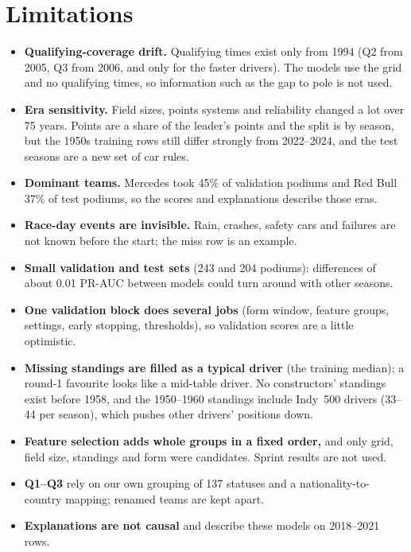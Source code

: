 \documentclass[11pt,a4paper]{article}
\begin{document}
\section{Limitations}
\begin{itemize}
\item \textbf{Qualifying-coverage drift.} Qualifying times exist only from 1994 (Q2 from 2005, Q3 from 2006, and only for the faster drivers). The models use the grid and no qualifying times, so information such as the gap to pole is not used.
\item \textbf{Era sensitivity.} Field sizes, points systems and reliability changed a lot over 75 years. Points are a share of the leader's points and the split is by season, but the 1950s training rows still differ strongly from 2022--2024, and the test seasons are a new set of car rules.
\item \textbf{Dominant teams.} Mercedes took 45\% of validation podiums and Red Bull 37\% of test podiums, so the scores and explanations describe those eras.
\item \textbf{Race-day events are invisible.} Rain, crashes, safety cars and failures are not known before the start; the miss row is an example.
\item \textbf{Small validation and test sets} (243 and 204 podiums): differences of about 0.01 PR-AUC between models could turn around with other seasons.
\item \textbf{One validation block does several jobs} (form window, feature groups, settings, early stopping, thresholds), so validation scores are a little optimistic.
\item \textbf{Missing standings are filled as a typical driver} (the training median); a round-1 favourite looks like a mid-table driver. No constructors' standings exist before 1958, and the 1950--1960 standings include Indy~500 drivers (33--44 per season), which pushes other drivers' positions down.
\item \textbf{Feature selection adds whole groups in a fixed order,} and only grid, field size, standings and form were candidates. Sprint results are not used.
\item \textbf{Q1--Q3} rely on our own grouping of 137 statuses and a nationality-to-country mapping; renamed teams are kept apart.
\item \textbf{Explanations are not causal} and describe these models on 2018--2021 rows.
\end{itemize}

\end{document}
